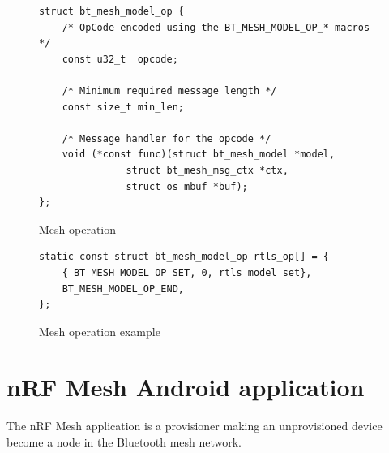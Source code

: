 \documentclass[\main/main.tex]{subfiles}
\begin{document}
\begin{figure}[H]
    \begin{lstlisting}[style=CStyle]
struct bt_mesh_model_op {
	/* OpCode encoded using the BT_MESH_MODEL_OP_* macros */
	const u32_t  opcode;

	/* Minimum required message length */
	const size_t min_len;

	/* Message handler for the opcode */
	void (*const func)(struct bt_mesh_model *model,
			   struct bt_mesh_msg_ctx *ctx,
			   struct os_mbuf *buf);
};
    \end{lstlisting}
    \caption{Mesh operation}
    \label{fig:mesh_model_operation}
\end{figure}

\begin{figure}[H]
    \begin{lstlisting}[style=CStyle]
static const struct bt_mesh_model_op rtls_op[] = {
    { BT_MESH_MODEL_OP_SET, 0, rtls_model_set},
    BT_MESH_MODEL_OP_END,
};
\end{lstlisting}
\caption{Mesh operation example}
\label{fig:mesh_model_operation_example}
\end{figure}

\section{nRF Mesh Android application}
The nRF Mesh application is a provisioner making an unprovisioned device become a node in the Bluetooth mesh network.
\end{document}
